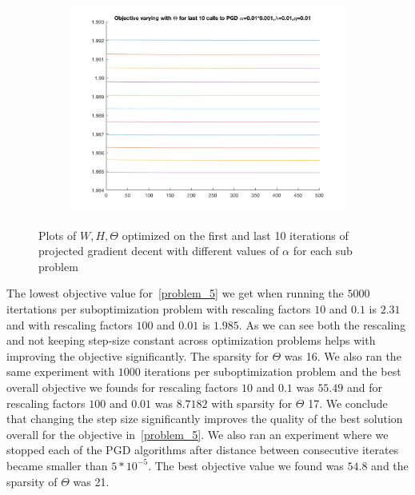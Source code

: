 \documentclass{article}
\newcommand{\0}{\mathrm{0}}
\newcommand{\1}{\mathrm{1}}
\begin{document}
\begin{figure}[H]
\begin{subfigure}[b]{0.3\textwidth}
  \end{subfigure}
\centering
  \begin{subfigure}[b]{0.3\textwidth}
    \includegraphics[width=\textwidth]{fixed-step-change-alpha-Th100last.png}
  \end{subfigure}

  \caption{Plots of $W, H, \Theta$ optimized on the first and last 10 iterations of projected gradient decent with different values of $\alpha$ for each sub problem}
\end{figure}
The lowest objective value for~\ref{problem_5} we get when running the $5000$ itertations per suboptimization problem with rescaling factors $10$ and $0.1$ is $2.31$ and with rescaling factors $100$ and $0.01$ is $1.985$. As we can see both the rescaling and not keeping step-size constant across optimization problems helps with improving the objective significantly. The sparsity for $\Theta$ was 16. We also ran the same experiment with $1000$ iterations per suboptimization problem and the best overall objective we founds for rescaling factors $10$ and $0.1$ was $55.49$ and for rescaling factors $100$ and $0.01$ was $8.7182$ with sparsity for $\Theta$ 17. We conclude that changing the step size significantly improves the quality of the best solution overall for the objective in~\ref{problem_5}. We also ran an experiment where we stopped each of the PGD algorithms after distance between consecutive iterates became smaller than $5*10^{-5}$. The best objective value we found was $54.8$ and the sparsity of $\Theta$ was 21.
\end{document}
